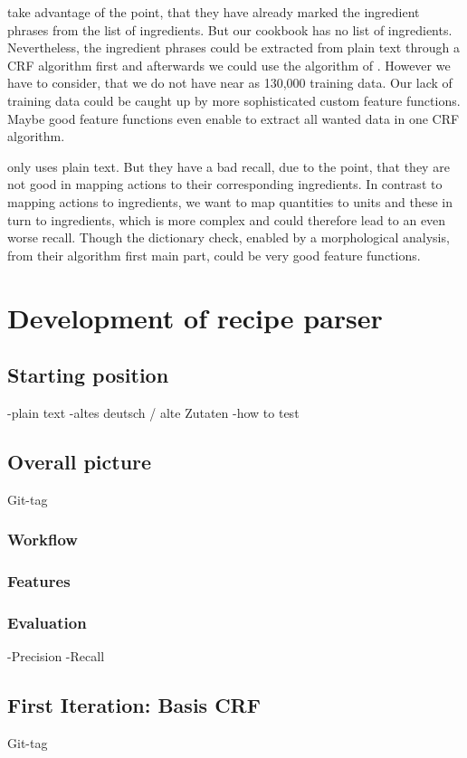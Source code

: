 \documentclass[12pt, twoside]{report}
\begin{document}
\parencite{CRFZeit} take advantage of the point, that they have already marked the ingredient phrases from the list of ingredients. But our cookbook has no list of ingredients. Nevertheless, the ingredient phrases could be extracted from plain text through a CRF algorithm first and afterwards we could use the algorithm of \parencite{CRFZeit}. However we have to consider, that we do not have near as 130,000 training data. Our lack of training data could be caught up by more sophisticated custom feature functions. Maybe good feature functions even enable to extract all wanted data in one CRF algorithm.

\parencite{GrammaBased} only uses plain text. But they have a bad recall, due to the point, that they are not good in mapping actions to their corresponding ingredients. 
In contrast to mapping actions to ingredients, we want to map quantities to units and these in turn to ingredients, which is more complex and could therefore lead to an even worse recall. Though the dictionary check, enabled by a morphological analysis, from their algorithm first main part, could be very good feature functions.



\chapter{Development of recipe parser}

\section{Starting position}
-plain text
-altes deutsch / alte Zutaten
-how to test

\section{Overall picture}
Git-tag
\subsection{Workflow}
\subsection{Features}
\subsection{Evaluation}
-Precision -Recall

\section{First Iteration: Basis CRF}
Git-tag
\end{document}
